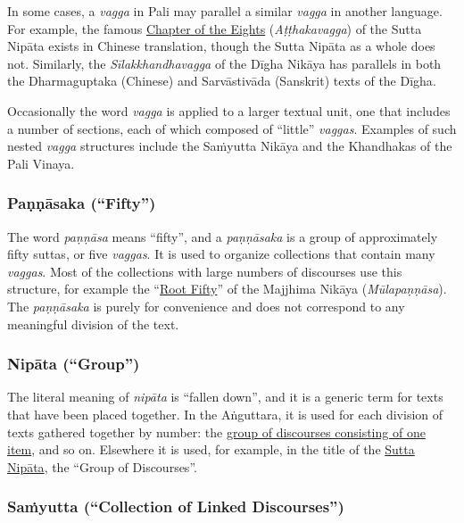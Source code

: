 \documentclass[12pt,openany]{book}%
\begin{document}
In some cases, a \textit{vagga} in Pali may parallel a similar \textit{vagga} in another language. For example, the famous \href{snp{-}atthakavagga}{Chapter of the Eights} (\textit{\textsanskrit{Aṭṭhakavagga}}) of the Sutta \textsanskrit{Nipāta} exists in Chinese translation, though the Sutta \textsanskrit{Nipāta} as a whole does not. Similarly, the \textit{\textsanskrit{Sīlakkhandhavagga}} of the \textsanskrit{Dīgha} \textsanskrit{Nikāya} has parallels in both the Dharmaguptaka (Chinese) and \textsanskrit{Sarvāstivāda} (Sanskrit) texts of the \textsanskrit{Dīgha}.

Occasionally the word \textit{vagga} is applied to a larger textual unit, one that includes a number of sections, each of which composed of “little” \textit{vaggas}. Examples of such nested \textit{vagga} structures include the \textsanskrit{Saṁyutta} \textsanskrit{Nikāya} and the Khandhakas of the Pali Vinaya.

\subsubsection*{\textsanskrit{Paṇṇāsaka} (“Fifty”)}

The word \textit{\textsanskrit{paṇṇāsa}} means “fifty”, and a \textit{\textsanskrit{paṇṇāsaka}} is a group of approximately fifty suttas, or five \textit{vaggas}. It is used to organize collections that contain many \textit{vaggas}. Most of the collections with large numbers of discourses use this structure, for example the “\href{mn{-}mulapannasa}{Root Fifty}” of the Majjhima \textsanskrit{Nikāya} (\textit{\textsanskrit{Mūlapaṇṇāsa}}). The \textit{\textsanskrit{paṇṇāsaka}} is purely for convenience and does not correspond to any meaningful division of the text.

\subsubsection*{\textsanskrit{Nipāta} (“Group”)}

The literal meaning of \textit{\textsanskrit{nipāta}} is “fallen down”, and it is a generic term for texts that have been placed together. In the \textsanskrit{Aṅguttara}, it is used for each division of texts gathered together by number: the \href{an1}{group of discourses consisting of one item}, and so on. Elsewhere it is used, for example, in the title of the \href{snp}{Sutta Nipāta}, the “Group of Discourses”.

\subsubsection*{\textsanskrit{Saṁyutta} (“Collection of Linked Discourses”)}
\end{document}

